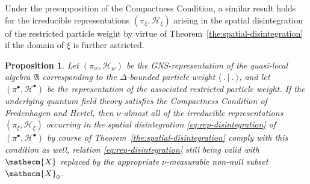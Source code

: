 \documentclass[a4paper,a4paper]{article}
\numberwithin{equation}{section}
\newcommand{\Xecm}{\mathecm{X}}
\newcommand{\Afrak}{\mathfrak{A}}
\newcommand{\Hscr}{\mathscr{H}}
\newcommand{\Hbullet}{\mathscr{H}^\bullet}
\theoremstyle{definition}
\theoremstyle{plain}
\newtheorem{proposition}[definition]{Proposition}
\theoremstyle{remark}
\theoremstyle{assumption}
\newcommand{\scp}[2]{\langle #1 \vert #2 \rangle}
\begin{document}
  Under the presupposition of the Compactness Condition, a similar
  result holds for the irreducible representations $( \pi_\xi ,
  \Hscr_\xi )$ arising in the spatial disintegration of the restricted
  particle weight by virtue of
  Theorem~\ref{the:spatial-disintegration} if the domain of $\xi$ is
  further astricted.
  \begin{proposition}
    \label{pro:xi-precompactness}
    Let $( \pi_w , \Hscr_w )$ be the GNS-representation of the
    quasi-local algebra $\Afrak$ corresponding to the $\Delta$-bounded
    particle weight $\scp{~.~}{~.~}$, and let $( \pi^\bullet ,
    \Hbullet )$ be the representation of the associated restricted
    particle weight. If the underlying quantum field theory satisfies
    the Compactness Condition of Fredenhagen and Hertel, then
    $\nu$-almost all of the irreducible representations $( \pi_\xi ,
    \Hscr_\xi )$ occurring in the spatial disintegration
    \eqref{eq:rep-disintegration} of $( \pi^\bullet , \Hbullet )$ by
    course of Theorem~\ref{the:spatial-disintegration} comply with
    this condition as well, relation \eqref{eq:rep-disintegration}
    still being valid with $\Xecm$ replaced by the appropriate
    $\nu$-measurable non-null subset $\Xecm_0$.
  \end{proposition}
  
\end{document}
